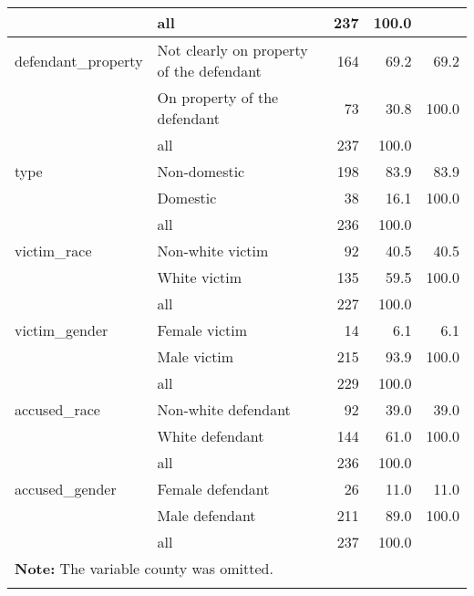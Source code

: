 \documentclass[11pt, oneside]{article}   	%
\begin{document}
{\begin{longtable}{ll|rrr}
   \hline
 & all & 237 & 100.0 &  \\ 
   \hline
\hline
defendant\_property & Not clearly on property of the defendant & 164 & 69.2 & 69.2 \\ 
   & On property of the defendant & 73 & 30.8 & 100.0 \\ 
   \hline
 & all & 237 & 100.0 &  \\ 
   \hline
\hline
type & Non-domestic & 198 & 83.9 & 83.9 \\ 
   & Domestic & 38 & 16.1 & 100.0 \\ 
   \hline
 & all & 236 & 100.0 &  \\ 
   \hline
\hline
victim\_race & Non-white victim & 92 & 40.5 & 40.5 \\ 
   & White victim & 135 & 59.5 & 100.0 \\ 
   \hline
 & all & 227 & 100.0 &  \\ 
   \hline
\hline
victim\_gender & Female victim & 14 & 6.1 & 6.1 \\ 
   & Male victim & 215 & 93.9 & 100.0 \\ 
   \hline
 & all & 229 & 100.0 &  \\ 
   \hline
\hline
accused\_race & Non-white defendant & 92 & 39.0 & 39.0 \\ 
   & White defendant & 144 & 61.0 & 100.0 \\ 
   \hline
 & all & 236 & 100.0 &  \\ 
   \hline
\hline
accused\_gender & Female defendant & 26 & 11.0 & 11.0 \\ 
   & Male defendant & 211 & 89.0 & 100.0 \\ 
   \hline
 & all & 237 & 100.0 &  \\ 
   \hline  \multicolumn{5}{l}{\textbf{Note: }
             The variable county was omitted.} \\ \hline
\hline
\hline
\label{Summary statistics for categorical variables}
\end{longtable}
}

\pagebreak
\end{document}
